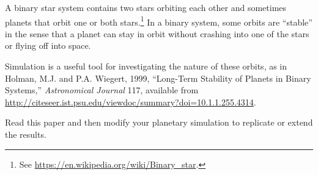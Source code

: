 \documentclass[
]{book}
\numberwithin{Answer}{chapter}
\numberwithin{Exercise}{chapter}
\begin{document}
\begin{ex}
\label{ex:binary}

A binary star system contains two stars orbiting each other and
sometimes planets that orbit one or both stars.\footnote{See
\url{https://en.wikipedia.org/wiki/Binary_star}.}  In a binary
system, some orbits are ``stable'' in the sense that a planet can stay
in orbit without crashing into one of the stars or flying off into
space.

Simulation is a useful tool for investigating the nature of these
orbits, as in Holman, M.J. and P.A. Wiegert, 1999, ``Long-Term Stability
of Planets in Binary Systems,''  {\em Astronomical Journal} 117,
available from \url{http://citeseer.ist.psu.edu/viewdoc/summary?doi=10.1.1.255.4314}.

Read this paper and then modify your planetary simulation to
replicate or extend the results.
\end{ex}
\end{document}
